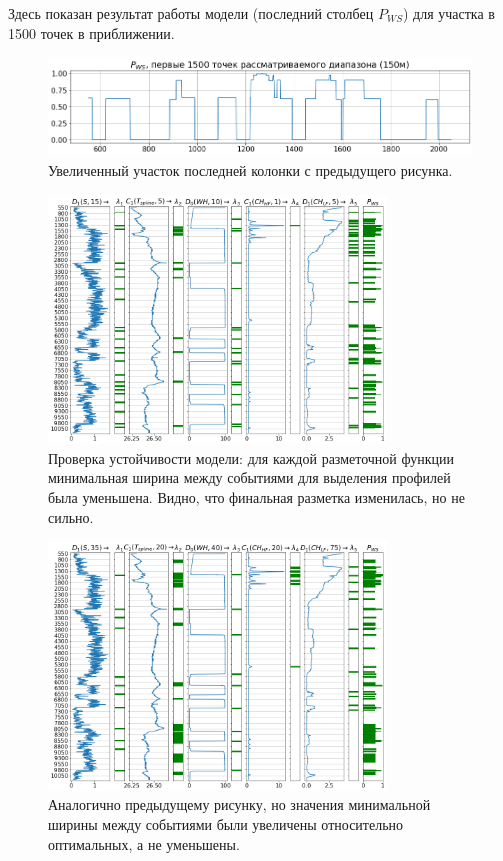 \par
Здесь показан результат работы модели (последний столбец $P_{WS}$) для участка в 1500 точек в приближении. 

\begin{figure}[H]
\centering
\includegraphics[width=1.0\textwidth]{WS/probability_flat.png}
\caption{Увеличенный участок последней колонки с предыдущего рисунка.}
\label{fig:probability_flat}
\end{figure}

\begin{figure}[H]
\centering
\includegraphics[width=0.8\textwidth]{WS/results_narrow.png}
\caption{Проверка устойчивости модели: для каждой разметочной функции минимальная ширина между событиями для выделения профилей была уменьшена. Видно, что финальная разметка изменилась, но не сильно.}
\label{fig:results_narrow}
\end{figure}

\begin{figure}[H]
\centering
\includegraphics[width=0.8\textwidth]{WS/results_wide.png}
\caption{Аналогично предыдущему рисунку, но значения минимальной ширины между событиями были увеличены относительно оптимальных, а не уменьшены.}
\label{fig:results_wide}
\end{figure}
















